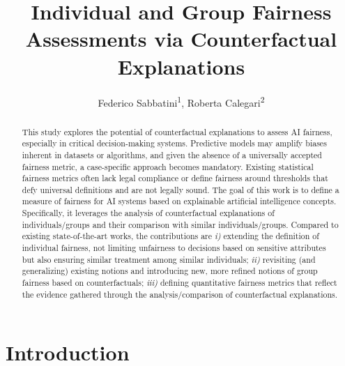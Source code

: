 \documentclass[letterpaper]{article} %
\title{Individual and Group Fairness Assessments via Counterfactual Explanations}
\author{
    Federico Sabbatini\textsuperscript{\rm 1}, Roberta Calegari\textsuperscript{\rm 2}
}
\begin{document}
\maketitle

\begin{abstract}
This study explores the potential of counterfactual explanations to assess AI fairness, especially in critical decision-making systems. Predictive models may amplify biases inherent in datasets or algorithms, and given the absence of a universally accepted fairness metric, a case-specific approach becomes mandatory. 
%
Existing statistical fairness metrics often lack legal compliance or define fairness around thresholds that defy universal definitions and are not legally sound.
%
The goal of this work is to define a measure of fairness for AI systems based on explainable artificial intelligence concepts. Specifically, it leverages the analysis of counterfactual explanations of individuals/groups and their comparison with similar individuals/groups. Compared to existing state-of-the-art works, the contributions are \textit{i)} extending the definition of individual fairness, not limiting unfairness to decisions based on sensitive attributes but also ensuring similar treatment among similar individuals; \textit{ii)} revisiting (and generalizing) existing notions and introducing new, more refined notions of group fairness based on counterfactuals; \textit{iii)} defining quantitative fairness metrics that reflect the evidence gathered through the analysis/comparison of counterfactual explanations.
\end{abstract}

%

\section{Introduction}\label{sec:introduction}
\end{document}
